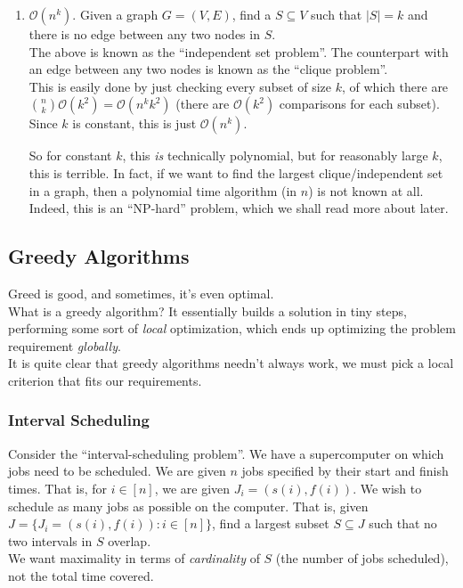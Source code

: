 \begin{enumerate}
	\item $\mathcal{O}(n^k)$. Given a graph $G=(V,E)$, find a $S\subseteq V$ such that $|S|=k$ and there is no edge between any two nodes in $S$.\\
	The above is known as the ``independent set problem''. The counterpart with an edge between any two nodes is known as the ``clique problem''.\\
	This is easily done by just checking every subset of size $k$, of which there are $\binom{n}{k}\mathcal{O}(k^2)=\mathcal{O}(n^k k^2)$ (there are $\mathcal{O}(k^2)$ comparisons for each subset). Since $k$ is constant, this is just $\mathcal{O}(n^k)$.

	So for constant $k$, this \textit{is} technically polynomial, but for reasonably large $k$, this is terrible. In fact, if we want to find the largest clique/independent set in a graph, then a polynomial time algorithm (in $n$) is not known at all. Indeed, this is an ``NP-hard'' problem, which we shall read more about later.

\end{enumerate}


\subsection{Greedy Algorithms}

Greed is good, and sometimes, it's even optimal.\\

What is a greedy algorithm? It essentially builds a solution in tiny steps, performing some sort of \textit{local} optimization, which ends up optimizing the problem requirement \textit{globally}.\\
It is quite clear that greedy algorithms needn't always work, we must pick a local criterion that fits our requirements.

\subsubsection{Interval Scheduling}

Consider the ``interval-scheduling problem''. We have a supercomputer on which jobs need to be scheduled. We are given $n$ jobs specified by their start and finish times. That is, for $i\in[n]$, we are given $J_i = (s(i),f(i))$. We wish to schedule as many jobs as possible on the computer. That is, given $J = \{J_i = (s(i),f(i)) : i\in[n]\}$, find a largest subset $S\subseteq J$ such that no two intervals in $S$ overlap.\\
We want maximality in terms of \textit{cardinality} of $S$ (the number of jobs scheduled), not the total time covered.

